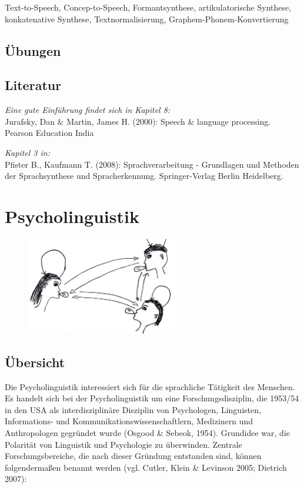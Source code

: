 \documentclass[11pt]{book}
\begin{document}
Text-to-Speech, Concep-to-Speech, Formantsynthese, artikulatorische Synthese, konkatenative Synthese, Textnormalisierung, Graphem-Phonem-Konvertierung

\section{Übungen}



\section{Literatur}


\emph{Eine gute Einführung findet sich in Kapitel 8:}\\
Jurafsky, Dan \& Martin, James H. (2000): Speech \& language processing. Pearson Education India

\emph{Kapitel 3 in:}\\
Pfister B., Kaufmann T. (2008): Sprachverarbeitung - Grundlagen und 
	Methoden der Sprachsynthese und Spracherkennung. 
	Springer-Verlag Berlin Heidelberg.


\renewcommand\refname{\vskip -1cm}
{}










\chapter{Psycholinguistik}
\begin{figure}[htbp]
\begin{center}
\includegraphics[width=0.6\textwidth]{grafiken/psycholinguistik/psycholinguistik}
\label{t9}
\end{center}
\end{figure}
\section{Übersicht}
Die Psycholinguistik interessiert sich für die sprachliche Tätigkeit des Menschen. Es handelt sich bei der Psycholinguistik um eine Forschungsdisziplin, die 1953/54 in den USA als interdisziplinäre Disziplin von Psychologen, Linguisten, Informations- und Kommunikationswissenschaftlern, Medizinern und Anthropologen gegründet wurde (Osgood \& Sebeok, 1954). Grundidee war, die Polarität von Linguistik und Psychologie zu überwinden. Zentrale Forschungsbereiche, die nach dieser Gründung entstanden sind, können folgendermaßen benannt werden (vgl. Cutler, Klein \& Levinson 2005; Dietrich 2007):
\end{document}
